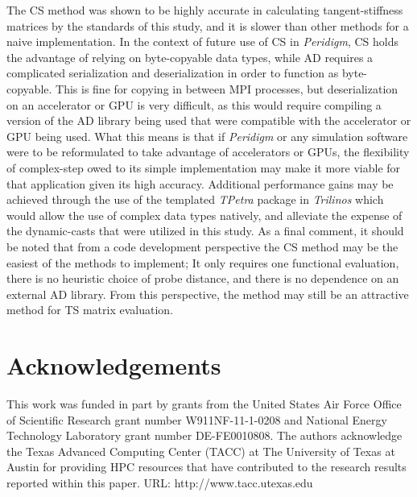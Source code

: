 \documentclass[preprint,12pt]{elsarticle}
\begin{document}
The CS method was shown to be highly accurate in calculating tangent-stiffness
matrices by the standards of this study, and it is slower than other methods
for a naive implementation. In the context of future use of CS in
\emph{Peridigm}, CS holds the advantage of relying on byte-copyable data types,
while AD requires a complicated serialization and deserialization in order to
function as byte-copyable. This is fine for copying in between MPI processes,
but deserialization on an accelerator or GPU is very difficult, as this would
require compiling a version of the AD library being used that were compatible
with the accelerator or GPU being used. What this means is that if
\emph{Peridigm} or any simulation software were to be reformulated to take
advantage of accelerators or GPUs, the flexibility of complex-step owed to its
simple implementation may make it more viable for that application given its
high accuracy. Additional performance gains may be achieved through the use of
the templated \emph{TPetra} package in \emph{Trilinos} which would allow the
use of complex data types natively, and alleviate the expense of the
dynamic-casts that were utilized in this study.  As a final comment, it should
be noted that from a code development perspective the CS method may be the
easiest of the methods to implement; It only requires one functional
evaluation, there is no heuristic choice of probe distance, and there is no
dependence on an external AD library.  From this perspective, the method may
still be an attractive method for TS matrix evaluation.



\section{Acknowledgements}
\label{sec:ack}
This work was funded in part by grants from the United States Air Force Office of Scientific Research grant number W911NF-11-1-0208 and National Energy Technology Laboratory grant number DE-FE0010808. The authors acknowledge the Texas Advanced Computing Center (TACC) at The University of Texas at Austin for providing HPC resources that have contributed to the research results reported within this paper. URL: http://www.tacc.utexas.edu

\end{document}
